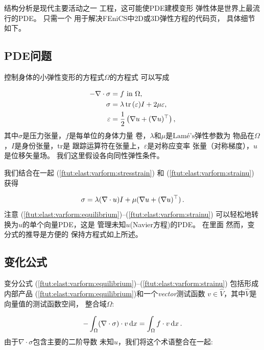 
结构分析是现代主要活动之一
工程，这可能使PDE建模变形
弹性体是世界上最流行的PDE。 只需一个
用于解决FEniCS中2D或3D弹性方程的代码页，
具体细节如下。

\subsection{PDE问题}


控制身体的小弹性变形的方程式$\Omega$的方程式
可以写成

\begin{align}
-\nabla\cdot\sigma &= f\hbox{ in }\Omega,
\label{ftut:elast:varform:equilibrium}\\
\sigma &= \lambda\,\hbox{tr}\,(\varepsilon) I + 2\mu\varepsilon,
\label{ftut:elast:varform:stresstrain}\\
\varepsilon &= \frac{1}{2}\left(\nabla u + (\nabla u)^{\top}\right),
\label{ftut:elast:varform:strainu}
\end{align}
其中$\sigma$是压力张量，$f$是每单位的身体力量
卷，$\lambda$和$\mu$是$\text{Lam\'e's}$弹性参数为
物品在$\Omega$，$I$是身份张量，$\mathrm{tr}$是
跟踪运算符在张量上，$\varepsilon$是对称应变率
张量（对称梯度），$u$是位移矢量场。
我们这里假设各向同性弹性条件。

我们结合在一起 (\ref{ftut:elast:varform:stresstrain}) 和
(\ref{ftut:elast:varform:strainu}) 获得

\begin{equation}
\sigma = \lambda(\nabla\cdot u)I + \mu(\nabla u + (\nabla u)^{\top})\thinspace .
\label{ftut:elast:varform:stressu}
\end{equation}
注意
(\ref{ftut:elast:varform:equilibrium})--(\ref{ftut:elast:varform:strainu})
可以轻松地转换为$u$的单个向量PDE，这是
管理未知$u$(Navier方程)的PDE。 在里面
然而，变分式的推导是方便的
保持方程式如上所述。

\subsection{变化公式}
\label{ftut:elast:varform}

变分公式
(\ref{ftut:elast:varform:equilibrium})--(\ref{ftut:elast:varform:strainu})
包括形成内部产品
(\ref{ftut:elast:varform:equilibrium})和一个\emph{vector}测试函数
$v\in \hat{V}$，其中$\hat{V}$是向量值的测试函数空间，
整合域$\Omega$:

\[ -\int_\Omega (\nabla\cdot\sigma) \cdot v \, \mathrm{d}x =
\int_\Omega f\cdot v\, \mathrm{d}x\thinspace .\]
由于$\nabla\cdot\sigma $包含主要的二阶导数
未知$u$，我们将这个术语整合在一起:

